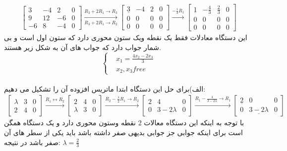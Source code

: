 \documentclass{article}
\begin{document}
\begin{gather*}
\begin{bmatrix}
3&-4&2&0\\
9&12&-6&0\\
-6&8&-4&0
\end{bmatrix}\xrightarrow[R_3+2R_1\to R_2]{R_3+2R_1\to R_3}
\begin{bmatrix}
\underline{3}&-4&2&0\\
0&0&0&0\\
0&0&0&0
\end{bmatrix}\xrightarrow{-\frac{1}{3}R_1}
\begin{bmatrix}
\underline{1}&-\frac{4}{3}&\frac{2}{3}&0\\
0&0&0&0\\
0&0&0&0
\end{bmatrix}
\end{gather*}	
این دستگاه معادلات فقط یک نقطه ویک ستون محوری دارد که ستون اول است و بی شمار جواب دارد که جواب های آن به شکل زیر هستند.
\begin{equation*}
\left\{
\begin{array}{rl}
&x_1=\frac{4x_2-2x_3}{3}\\
&x_2,x_3 free
\end{array} \right.
\end{equation*}
\\
الف)برای حل این دستگاه ابتدا ماتریس افزوده آن را تشکیل می دهیم:
\begin{gather*}
\begin{bmatrix}
\lambda&3&0\\
2&4&0
\end{bmatrix}\xrightarrow{R_1\leftrightarrow R_2}
\begin{bmatrix}
2&4&0\\
\lambda&3&0
\end{bmatrix}\xrightarrow{R_2-\frac{\lambda}{2}R_1\to R_2}
\begin{bmatrix}
2&4&0\\
0&3-2\lambda&0
\end{bmatrix}
\xrightarrow{R_1-\frac{4}{3-2\lambda}\to R_1}
\begin{bmatrix}
\underline{2}&0&0\\
0&\underline{3-2\lambda}&0
\end{bmatrix}
\end{gather*}
با توجه به اینکه این دستگاه معالات 2 نقطه وستون محوری دارد و یک دستگاه همگن است برای اینکه جوابی جز جوابی بدیهی صفر داشته باشد باید یکی از سطر های آن صفر باشد در نتیجه:
$\lambda=\frac{2}{3}$
\end{document}
